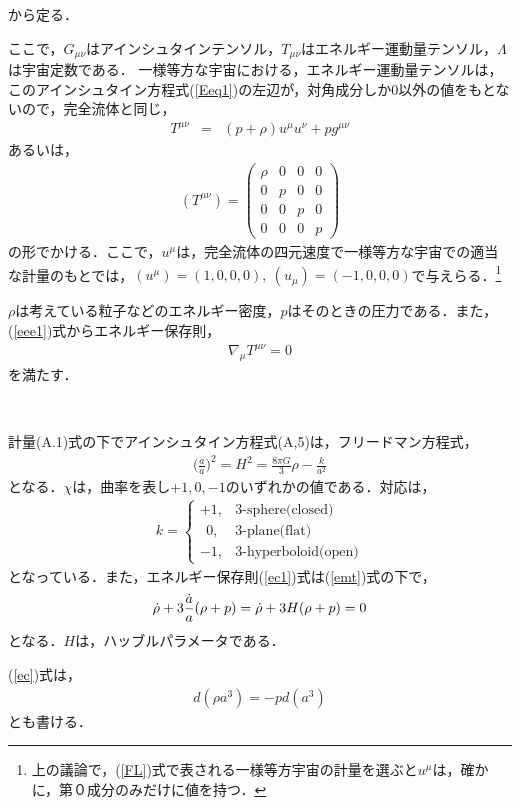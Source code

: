 から定る．

ここで，$G_{\mu\nu}$はアインシュタインテンソル，$T_{\mu\nu}$はエネルギー運動量テンソル，$\Lambda$は宇宙定数である．
一様等方な宇宙における，エネルギー運動量テンソルは，このアインシュタイン方程式(\ref{Eeq1})の左辺が，対角成分しか$0$以外の値をもとないので，完全流体と同じ，
\begin{eqnarray}
\label{emt10}
T^{\mu\nu}&=&(p+\rho)u^{\mu}u^{\nu}+pg^{\mu\nu}
\end{eqnarray}
あるいは，
\begin{eqnarray}
\label{emt}
(T^{\mu\nu})=\left(\begin{array}{cccc}\rho & 0 & 0 & 0 \\0 & p & 0 & 0 \\0 & 0 & p & 0 \\0 & 0 & 0 & p\end{array}\right)
\end{eqnarray}
の形でかける．ここで，$u^{\mu}$は，完全流体の四元速度で一様等方な宇宙での適当な計量のもとでは，$(u^{\mu})=(1,0,0,0), \ (u_{\mu})=(-1,0,0,0)$で与えらる．\footnote{上の議論で，(\ref{FL})式で表される一様等方宇宙の計量を選ぶと$u^{\mu}$は，確かに，第０成分のみだけに値を持つ．}

$\rho$は考えている粒子などのエネルギー密度，$p$はそのときの圧力である．また，(\ref{eee1})式からエネルギー保存則，
\begin{eqnarray}
\label{ec1}
\nabla_{\mu}T^{\mu\nu}=0
\end{eqnarray}
を満たす．
\begin{empheqboxed}
\

計量(A.1)式の下でアインシュタイン方程式(A,5)は，フリードマン方程式，
\begin{eqnarray}
\label{fre}
\biggl(\frac{\dot{a}}{a}\biggr)^2=H^2=\frac{8\pi G}{3}\rho-\frac{k}{a^2}
\end{eqnarray}
となる．$\chi$は，曲率を表し$+1,0,-1$のいずれかの値である．対応は，
\begin{eqnarray}
k=\begin{cases}
    +1, &\text{3-sphere(closed)} \\
     \ \ 0, &\text{3-plane(flat)} \\
     -1, &\text{3-hyperboloid(open)}
  \end{cases}
  \end{eqnarray}
となっている．また，エネルギー保存則(\ref{ec1})式は(\ref{emt})式の下で，
\begin{eqnarray}
\label{ec}
\dot{\rho}+3{\dot{a}\over a}(\rho+p)=\dot{\rho}+3H(\rho+p)=0
\end{eqnarray}
となる．$H$は，ハッブルパラメータである．
\end{empheqboxed}
(\ref{ec})式は，
\begin{eqnarray}
\label{ec2}
d(\rho a^3)=-p d(a^3)
\end{eqnarray}
とも書ける．

